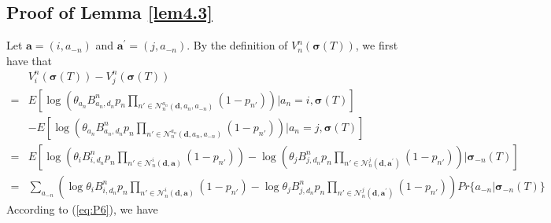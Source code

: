 \subsection{Proof of Lemma \ref{lem4.3}}\label{proof1-4}
Let $\boldsymbol{a}=(i, a_{-n})$ and $\boldsymbol{a}^{'}=(j, a_{-n})$. By the definition of $V_{n}^{n}(\boldsymbol{\sigma}(T))$, we first have that\begin{align}
 & V_{i}^{n}(\boldsymbol{\sigma}(T))-V_{j}^{n}(\boldsymbol{\sigma}(T))\nonumber \\
 = & E\left[\log\left(\theta_{a_{n}}B_{a_{n},d_{n}}^{n}p_{n}\prod_{n'\in\mathcal{N}_{n}^{a_{n}}(\boldsymbol{d},a_{n},a_{-n})}(1-p_{n'})\right)|a_{n}=i,\boldsymbol{\sigma}(T)\right]\nonumber \\
 & - E\left[\log\left(\theta_{a_{n}}B_{a_{n},d_{n}}^{n}p_{n}\prod_{n'\in\mathcal{N}_{n}^{a_{n}}(\boldsymbol{d},a_{n},a_{-n})}(1-p_{n'})\right)|a_{n}=j,\boldsymbol{\sigma}(T)\right]\nonumber \\
= & E\left[\log\left(\theta_{i}B_{i,d_{n}}^{n}p_{n}\prod_{n'\in\mathcal{N}_{n}^{i}(\boldsymbol{d},\boldsymbol{a})}(1-p_{n'})\right)-\log\left(\theta_{j}B_{j,d_{n}}^{n}p_{n}\prod_{n'\in\mathcal{N}_{n}^{j}(\boldsymbol{d},\boldsymbol{a}^{'})}(1-p_{n'})\right)|\boldsymbol{\sigma}_{-n}(T)\right]\nonumber \\
= & \sum_{a_{-n}}\left(\log\theta_{i}B_{i,d_{n}}^{n}p_{n}\prod_{n'\in\mathcal{N}_{n}^{i}(\boldsymbol{d},\boldsymbol{a})}(1-p_{n'})-\log\theta_{j}B_{j,d_{n}}^{n}p_{n}\prod_{n'\in\mathcal{N}_{n}^{j}(\boldsymbol{d},\boldsymbol{a}^{'})}(1-p_{n'})\right)Pr\{a_{-n}|\boldsymbol{\sigma}_{-n}(T)\}\label{eq:l1}\end{align}
According to (\ref{eq:P6}), we have

